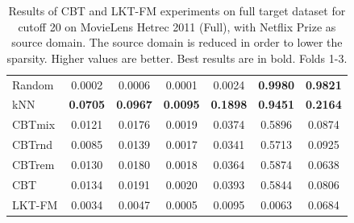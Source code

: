 \begin{table}[hbt]
\begin{tabulary}{\textwidth}{|L|CCCCCC|}
Random & 0.0002 & 0.0006 & 0.0001 & 0.0024 &\textbf{0.9980} & \textbf{0.9821} \\
kNN & \textbf{0.0705} &\textbf{0.0967} &\textbf{0.0095} &\textbf{0.1898} &\textbf{0.9451} & \textbf{0.2164} \\
CBTmix & 0.0121 & 0.0176 & 0.0019 & 0.0374 & 0.5896 & 0.0874 \\
CBTrnd & 0.0085 & 0.0139 & 0.0017 & 0.0341 & 0.5713 & 0.0925 \\
CBTrem & 0.0130 & 0.0180 & 0.0018 & 0.0364 & 0.5874 & 0.0638 \\
CBT & 0.0134 & 0.0191 & 0.0020 & 0.0393 & 0.5844 & 0.0806 \\
LKT-FM & 0.0034 & 0.0047 & 0.0005 & 0.0095 & 0.0063 & 0.0684 \\
\hline
\end{tabulary}
\caption{Results of CBT and LKT-FM experiments on full target dataset for cutoff 20 on MovieLens Hetrec 2011 (Full), with Netflix Prize as source domain. The source domain is reduced in order to lower the sparsity. Higher values are better. Best results are in bold. Folds 1-3.}
\end{table}

